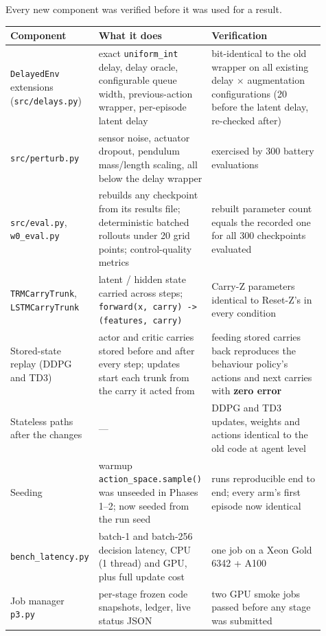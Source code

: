 \documentclass[11pt]{article}
\begin{document}
Every new component was verified before it was used for a result.



\begin{center}\small\begin{tabular}{>{\raggedright\arraybackslash}p{0.184\linewidth}>{\raggedright\arraybackslash}p{0.355\linewidth}>{\raggedright\arraybackslash}p{0.367\linewidth}}
\toprule
Component & What it does & Verification \\
\midrule
\texttt{DelayedEnv} extensions (\texttt{src/delays.py}) & exact \texttt{uniform\_int} delay, delay oracle, configurable queue width, previous-action wrapper, per-episode latent delay & bit-identical to the old wrapper on all existing delay $\times$ augmentation configurations (20 before the latent delay, re-checked after) \\
\texttt{src/\allowbreak{}perturb.\allowbreak{}py} & sensor noise, actuator dropout, pendulum mass/length scaling, all below the delay wrapper & exercised by 300 battery evaluations \\
\texttt{src/eval.py}, \texttt{w0\_eval.py} & rebuilds any checkpoint from its results file; deterministic batched rollouts under 20 grid points; control-quality metrics & rebuilt parameter count equals the recorded one for all 300 checkpoints evaluated \\
\texttt{TRMCarryTrunk}, \texttt{LSTMCarryTrunk} & latent / hidden state carried across steps; \texttt{forward(x,\allowbreak{} carry) -> (features,\allowbreak{} carry)} & Carry-Z parameters identical to Reset-Z's in every condition \\
Stored-state replay (DDPG and TD3) & actor and critic carries stored before and after every step; updates start each trunk from the carry it acted from & feeding stored carries back reproduces the behaviour policy's actions and next carries with \textbf{zero error} \\
Stateless paths after the changes & --- & DDPG and TD3 updates, weights and actions identical to the old code at agent level \\
Seeding & warmup \texttt{action\_\allowbreak{}space.\allowbreak{}sample()} was unseeded in Phases 1--2; now seeded from the run seed & runs reproducible end to end; every arm's first episode now identical \\
\texttt{bench\_\allowbreak{}latency.\allowbreak{}py} & batch-1 and batch-256 decision latency, CPU (1 thread) and GPU, plus full update cost & one job on a Xeon Gold 6342 + A100 \\
Job manager \texttt{p3.py} & per-stage frozen code snapshots, ledger, live status JSON & two GPU smoke jobs passed before any stage was submitted \\
\bottomrule
\end{tabular}\end{center}
\end{document}
